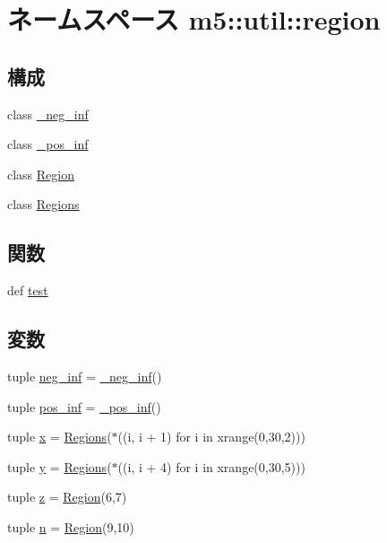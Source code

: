 \hypertarget{namespacem5_1_1util_1_1region}{
\section{ネームスペース m5::util::region}
\label{namespacem5_1_1util_1_1region}
}
\subsection*{構成}
\begin{DoxyCompactItemize}
\item 
class \hyperlink{classm5_1_1util_1_1region_1_1__neg__inf}{\_\-neg\_\-inf}
\item 
class \hyperlink{classm5_1_1util_1_1region_1_1__pos__inf}{\_\-pos\_\-inf}
\item 
class \hyperlink{classm5_1_1util_1_1region_1_1Region}{Region}
\item 
class \hyperlink{classm5_1_1util_1_1region_1_1Regions}{Regions}
\end{DoxyCompactItemize}
\subsection*{関数}
\begin{DoxyCompactItemize}
\item 
def \hyperlink{namespacem5_1_1util_1_1region_aa2760b1165ecae2e04eb2e661ba1841d}{test}
\end{DoxyCompactItemize}
\subsection*{変数}
\begin{DoxyCompactItemize}
\item 
tuple \hyperlink{namespacem5_1_1util_1_1region_a52a715d427fb475b545ea40b2206bce6}{neg\_\-inf} = \hyperlink{classm5_1_1util_1_1region_1_1__neg__inf}{\_\-neg\_\-inf}()
\item 
tuple \hyperlink{namespacem5_1_1util_1_1region_a2a1e9ac365d454cdb95f4f29f14fcdaf}{pos\_\-inf} = \hyperlink{classm5_1_1util_1_1region_1_1__pos__inf}{\_\-pos\_\-inf}()
\item 
tuple \hyperlink{namespacem5_1_1util_1_1region_a7a74e6f2f6355f34b63513f77c839a9e}{x} = \hyperlink{classm5_1_1util_1_1region_1_1Regions}{Regions}($\ast$((i, i + 1) for i in xrange(0,30,2)))
\item 
tuple \hyperlink{namespacem5_1_1util_1_1region_addbecca6e1a6301f3c92a77b235c1a51}{y} = \hyperlink{classm5_1_1util_1_1region_1_1Regions}{Regions}($\ast$((i, i + 4) for i in xrange(0,30,5)))
\item 
tuple \hyperlink{namespacem5_1_1util_1_1region_a662153d49896c6e46645d171ec8e5dba}{z} = \hyperlink{classm5_1_1util_1_1region_1_1Region}{Region}(6,7)
\item 
tuple \hyperlink{namespacem5_1_1util_1_1region_aa804450d097df684fcc75a2916504c3f}{n} = \hyperlink{classm5_1_1util_1_1region_1_1Region}{Region}(9,10)
\end{DoxyCompactItemize}


